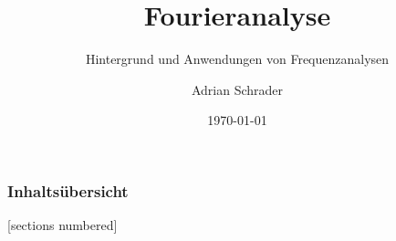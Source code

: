 \documentclass[10pt]{beamer}
\title{Fourieranalyse}
\subtitle{Hintergrund und Anwendungen von Frequenzanalysen}
\date{\today}
\author{Adrian Schrader}
\institute{Physik 4h, Herr Kuhn}
\begin{document}


\maketitle

\begin{frame}
  \frametitle{Inhaltsübersicht}
  [sections numbered]
  \tableofcontents
\end{frame}






\begin{frame}[allowframebreaks]

  \nocite{*}
  
  

\end{frame}

%
\end{document}
